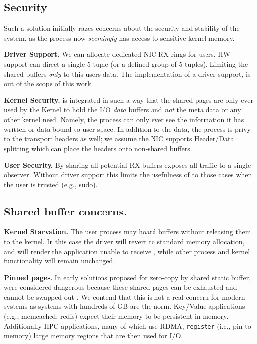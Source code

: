 \subsection{Security}
Such a solution initially razes concerns about the security and stability of the system, as the process now \emph{seemingly} has access to sensitive kernel memory. 

\noindent\textbf{Driver Support.} We can allocate dedicated NIC RX rings for \oursys users. HW support\cite{flow_direct} can direct a single 5 tuple (or a defined group of 5 tuples). Limiting the shared buffers \emph{only} to this users data. The implementation of a driver support, is out of the scope of this work. 

\noindent\textbf{Kernel Security.} \oursys is integrated in such a way that the shared pages are only ever used by the Kernel to hold the I/O \emph{data} buffers and \emph{not} the meta data or any other kernel need. Namely, the process can only ever see the information it has written or data bound to user-space. In addition to the data, the process is privy to the transport headers as well; we assume the NIC supports Header/Data splitting\cite{hds} which can place the headers onto non-shared buffers.

\noindent\textbf{User Security.} By sharing all potential RX buffers \oursys exposes all traffic to a single observer.
Without driver support this limits the usefulness of \oursys to those cases when the user is trusted (e.g., sudo). 

\subsection{Shared buffer concerns.}
\noindent\textbf{Kernel Starvation.} The user process may hoard \oursys buffers without releasing them to the kernel.
In this case the driver will revert to standard  memory allocation, and will render the application unable to receive , while other process and kernel functionality will remain unchanged.


\noindent\textbf{Pinned pages.} In early solutions proposed for zero-copy by shared static buffer, were considered dangerous because these shared pages can be exhausted and cannot be swapped out \cite{song2012performance,yamagiwa2005active}. We contend that this is not a real concern for modern systems as systems with hundreds of GB are the norm. Key/Value applications (e.g., memcached, redis) expect their memory to be persistent in memory. Additionally HPC applications, many\cite{top500} of which use RDMA, \texttt{register} (i.e., pin to memory) large memory regions that are then used for I/O.

